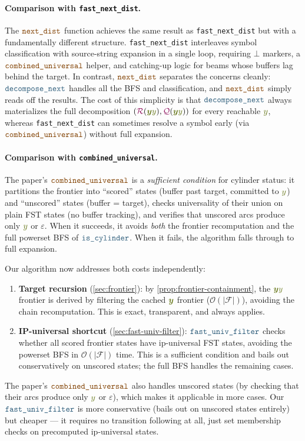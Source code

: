 \documentclass{article}
\theoremstyle{plain}
\newcommand{\Quotient}{{\color{TokenColor}\mathcal{Q}}}
\newcommand{\Remainder}{{\color{TokenColor}\mathcal{R}}}
\newcommand{\tgtSym}{{\color{CharacterColor}y}}
\newcommand{\tgtStr}{{\color{CharacterColor}\boldsymbol{y}}}
\newcommand{\frontier}{\mathcal{F}}
\newcommand{\mintedFunc}[1]{\mbox{\texttt{{\color{orange!50!black}#1}}}}
\newcommand{\myMintedFunc}[1]{\mbox{\texttt{{\color{StormBlue}#1}}}}
\newcommand{\continuous}[0]{\myMintedFunc{is\_cylinder}}
\newcommand{\decomposeNext}[0]{\myMintedFunc{decompose\_next}}
\newcommand{\ipUniversal}[0]{\myMintedFunc{fast\_univ\_filter}}
\begin{document}
\paragraph{Comparison with \texttt{fast\_next\_dist}.}
The $\mintedFunc{next\_dist}$ function achieves the same result as
\texttt{fast\_next\_dist} but with a fundamentally different structure.
\texttt{fast\_next\_dist} interleaves symbol classification with source-string
expansion in a single loop, requiring $\bot$ markers, a
$\mintedFunc{combined\_universal}$ helper, and catching-up logic for beams
whose buffers lag behind the target.
In contrast, $\mintedFunc{next\_dist}$ separates the concerns cleanly:
$\decomposeNext$ handles all the BFS and classification, and
$\mintedFunc{next\_dist}$ simply reads off the results.
The cost of this simplicity is that $\decomposeNext$ always materializes the
full decomposition $(\Remainder(\tgtStr\tgtSym), \Quotient(\tgtStr\tgtSym))$
for every reachable $\tgtSym$, whereas \texttt{fast\_next\_dist} can sometimes
resolve a symbol early (via $\mintedFunc{combined\_universal}$) without full
expansion.

\paragraph{Comparison with \texttt{combined\_universal}.}
The paper's $\mintedFunc{combined\_universal}$ is a \emph{sufficient condition}
for cylinder status: it partitions the frontier into ``scored'' states
(buffer past target, committed to $\tgtSym$) and ``unscored'' states
(buffer = target), checks universality of their union on plain FST states
(no buffer tracking), and verifies that unscored arcs produce only $\tgtSym$
or $\varepsilon$.
When it succeeds, it avoids \emph{both} the frontier recomputation and the
full powerset BFS of $\continuous$.
When it fails, the algorithm falls through to full expansion.

Our algorithm now addresses both costs independently:
\begin{enumerate}
\item \textbf{Target recursion} (\cref{sec:frontier}): by
  \cref{prop:frontier-containment}, the $\tgtStr\tgtSym$ frontier is derived by
  filtering the cached $\tgtStr$ frontier ($\mathcal{O}(|\frontier|)$),
  avoiding the chain recomputation.
  This is exact, transparent, and always applies.
\item \textbf{IP-universal shortcut} (\cref{sec:fast-univ-filter}):
  $\ipUniversal$ checks whether all scored frontier states have ip-universal
  FST states, avoiding the powerset BFS in $\mathcal{O}(|\frontier|)$ time.
  This is a sufficient condition and bails out conservatively on unscored
  states; the full BFS handles the remaining cases.
\end{enumerate}
The paper's $\mintedFunc{combined\_universal}$ also handles unscored states
(by checking that their arcs produce only $\tgtSym$ or $\varepsilon$), which
makes it applicable in more cases.
Our $\ipUniversal$ is more conservative (bails out on unscored states entirely)
but cheaper --- it requires no transition following at all, just set membership
checks on precomputed ip-universal states.
\end{document}
